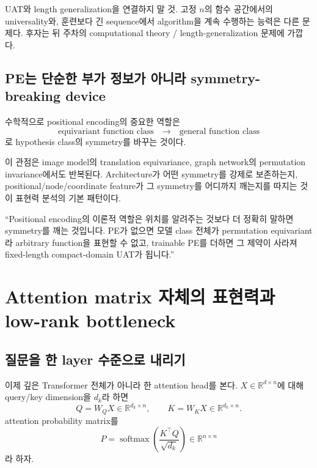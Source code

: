 \documentclass[11pt,a4paper,oneside,openany]{memoir}
\newcommand{\R}{\mathbb{R}}
\newcommand{\softmax}{\operatorname{softmax}}
\theoremstyle{definition}
\begin{document}
\begin{warningbox}
UAT와 length generalization을 연결하지 말 것. 고정 $n$의 함수 공간에서의 universality와,
훈련보다 긴 sequence에서 algorithm을 계속 수행하는 능력은 다른 문제다. 후자는 뒤 주차의 computational theory / length-generalization 문제에 가깝다.
\end{warningbox}

\section{PE는 단순한 부가 정보가 아니라 symmetry-breaking device}

수학적으로 positional encoding의 중요한 역할은
\[
\text{equivariant function class}
\quad\to\quad
\text{general function class}
\]
로 hypothesis class의 symmetry를 바꾸는 것이다.

이 관점은 image model의 translation equivariance, graph network의 permutation invariance에서도 반복된다.
Architecture가 어떤 symmetry를 강제로 보존하는지, positional/node/coordinate feature가 그 symmetry를 어디까지 깨는지를 따지는 것이 표현력 분석의 기본 패턴이다.

\begin{presentbox}
``Positional encoding의 이론적 역할은 위치를 알려주는 것보다 더 정확히 말하면 symmetry를 깨는 것입니다. PE가 없으면 모델 class 전체가 permutation equivariant라 arbitrary function을 표현할 수 없고, trainable PE를 더하면 그 제약이 사라져 fixed-length compact-domain UAT가 됩니다.''
\end{presentbox}

\chapter{Attention matrix 자체의 표현력과 low-rank bottleneck}

\section{질문을 한 layer 수준으로 내리기}

이제 깊은 Transformer 전체가 아니라 한 attention head를 본다.
$X\in\R^{d\times n}$에 대해 query/key dimension을 $d_k$라 하면
\[
Q=W_QX\in\R^{d_k\times n},
\qquad
K=W_KX\in\R^{d_k\times n}.
\]
attention probability matrix를
\[
P
=
\softmax\!\left(\frac{K^\top Q}{\sqrt{d_k}}\right)
\in\R^{n\times n}
\]
라 하자.
\end{document}
